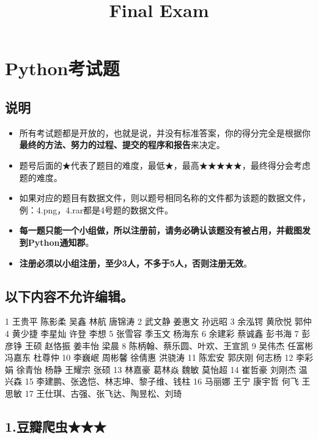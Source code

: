 \documentclass[11pt]{article}
\title{Final Exam}
\providecommand{\tightlist}{%
      \setlength{\itemsep}{0pt}\setlength{\parskip}{0pt}}
\begin{document}
    
    
    \maketitle
    
    

    
    \section{Python考试题}\label{pythonux8003ux8bd5ux9898}

\subsection{说明}\label{ux8bf4ux660e}

\begin{itemize}
\tightlist
\item
  所有考试题都是开放的，也就是说，并没有标准答案，你的得分完全是根据你\textbf{最终的方法、努力的过程、提交的程序和报告}来决定。
\item
  题号后面的★代表了题目的难度，最低★，最高★★★★★，最终得分会考虑题的难度。
\item
  如果对应的题目有数据文件，则以题号相同名称的文件都为该题的数据文件，例：4.png，4.rar都是4号题的数据文件。
\item
  \textbf{每一题只能一个小组做，所以注册前，请务必确认该题没有被占用，并截图发到Python通知郡}。
\item
  \textbf{注册必须以小组注册，至少3人，不多于5人，否则注册无效}。
\end{itemize}

\subsection{\texorpdfstring{\textbf{以下内容不允许编辑}。}{以下内容不允许编辑。}}\label{ux4ee5ux4e0bux5185ux5bb9ux4e0dux5141ux8bb8ux7f16ux8f91}

1 王贵平 陈影柔 吴鑫 林航 唐锦涛 2 武文静 姜惠文 孙远昭 3 余泓锷 黄欣悦
郭仲 4 黄少捷 李星灿 许登 李想 5 张雪容 季玉文 杨海东 6 余建彩 蔡诚鑫
彭书海 7 彭彦铮 王硕 赵恪振 姜丰怡 梁晨 8 陈柄翰、蔡乐圆、叶欢、王宣凯 9
吴伟杰 任富彬 冯嘉东 杜尊仲 10 李巍岷 周彬馨 徐倩惠 洪骁涛 11 陈宏安
郭庆刚 何志杨 12 李彩娟 徐青怡 杨静 王耀宗 张硕 13 林嘉豪 葛林焱 魏敏
莫怡超 14 崔哲豪 刘刚杰 温兴森 15 李建鹏、张逸恺、林志坤、黎子维、钱柱
16 马丽娜 王宁 康宇哲 何飞 王思敏 17 王仕琪、古强、张飞达、陶昱松、刘琦

    \subsection{1.豆瓣爬虫★★★}\label{ux8c46ux74e3ux722cux866b}
\end{document}
